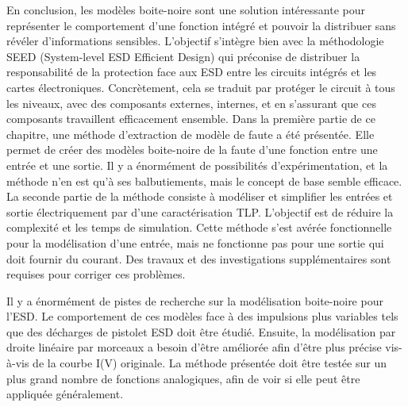En conclusion, les modèles boite-noire sont une solution intéressante pour représenter le comportement d'une fonction intégré et pouvoir la distribuer sans révéler d'informations sensibles.
L'objectif s'intègre bien avec la méthodologie SEED (System-level ESD Efficient Design) qui préconise de distribuer la responsabilité de la protection face aux ESD entre les circuits intégrés et les cartes électroniques.
Concrètement, cela se traduit par protéger le circuit à tous les niveaux, avec des composants externes, internes, et en s'assurant que ces composants travaillent efficacement ensemble.
Dans la première partie de ce chapitre, une méthode d'extraction de modèle de faute a été présentée.
Elle permet de créer des modèles boite-noire de la faute d'une fonction entre une entrée et une sortie.
Il y a énormément de possibilités d'expérimentation, et la méthode n'en est qu'à ses balbutiements, mais le concept de base semble efficace.
La seconde partie de la méthode consiste à modéliser et simplifier les entrées et sortie électriquement par d'une caractérisation TLP.
L'objectif est de réduire la complexité et les temps de simulation.
Cette méthode s'est avérée fonctionnelle pour la modélisation d'une entrée, mais ne fonctionne pas pour une sortie qui doit fournir du courant.
Des travaux et des investigations supplémentaires sont requises pour corriger ces problèmes.

Il y a énormément de pistes de recherche sur la modélisation boite-noire pour l'ESD.
Le comportement de ces modèles face à des impulsions plus variables tels que des décharges de pistolet ESD doit être étudié.
Ensuite, la modélisation par droite linéaire par morceaux a besoin d'être améliorée afin d'être plus précise vis-à-vis de la courbe I(V) originale.
La méthode présentée doit être testée sur un plus grand nombre de fonctions analogiques, afin de voir si elle peut être appliquée généralement.
